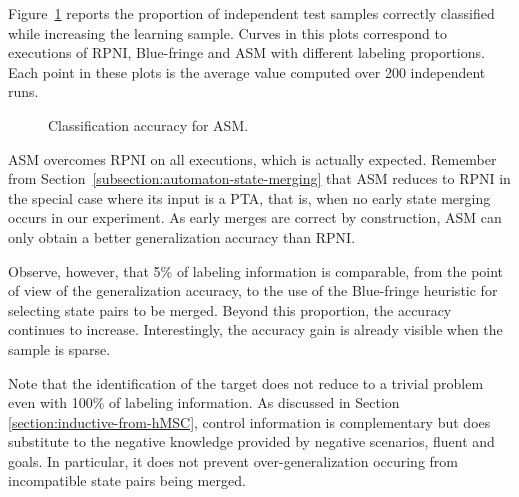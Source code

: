 Figure~\ref{image:evaluation-asm-accuracy} reports the proportion of independent test samples correctly classified while increasing the learning sample. Curves in this plots correspond to executions of RPNI, Blue-fringe and ASM with different labeling proportions. Each point in these plots is the average value computed over 200 independent runs. 

\begin{figure}
\begin{center}
\caption{Classification accuracy for ASM\label{image:evaluation-asm-accuracy}.}
\end{center}
\end{figure}

ASM overcomes RPNI on all executions, which is actually expected. Remember from Section~\ref{subsection:automaton-state-merging} that ASM reduces to RPNI in the special case where its input is a PTA, that is, when no early state merging occurs in our experiment. As early merges are correct by construction, ASM can only obtain a better generalization accuracy than RPNI.

Observe, however, that 5\% of labeling information is comparable, from the point of view of the generalization accuracy, to the use of the Blue-fringe heuristic for selecting state pairs to be merged. Beyond this proportion, the accuracy continues to increase. Interestingly, the accuracy gain is already visible when the sample is sparse.

Note that the identification of the target does not reduce to a trivial problem even with 100\% of labeling information. As discussed in Section \ref{section:inductive-from-hMSC}, control information is complementary but does substitute to the negative knowledge provided by negative scenarios, fluent and goals. In particular, it does not prevent over-generalization occuring from incompatible state pairs being merged. 
